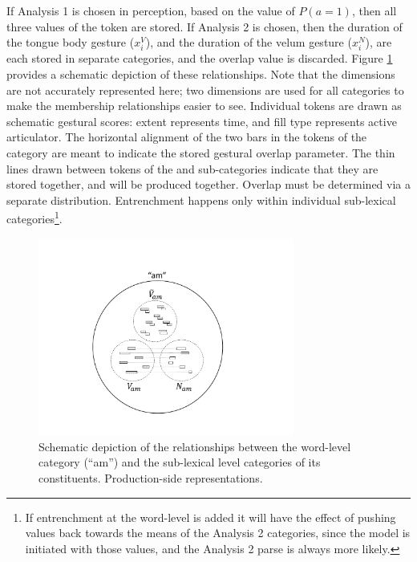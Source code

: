 If Analysis 1 is chosen in perception, based on the value of $P(a=1)$,
then all three values of the token are stored. If Analysis 2 is chosen,
then the duration of the tongue body gesture ($x_{i}^{V}$), and the
duration of the velum gesture ($x_{i}^{N}$), are each stored in separate
categories, and the overlap value is discarded. Figure \ref{fig:MultiParse-Reps}
provides a schematic depiction of these relationships. Note that the
dimensions are not accurately represented here; two dimensions are
used for all categories to make the membership relationships easier
to see. Individual tokens are drawn as schematic gestural scores:
extent represents time, and fill type represents active articulator.
The horizontal alignment of the two bars in the tokens of the category
are meant to indicate the stored gestural overlap parameter. The thin
lines drawn between tokens of the and sub-categories indicate that
they are stored together, and will be produced together. Overlap must
be determined via a separate distribution. Entrenchment happens only
within individual sub-lexical categories\footnote{If entrenchment at the word-level is added it will have the effect
of pushing values back towards the means of the Analysis 2 categories,
since the model is initiated with those values, and the Analysis 2
parse is always more likely.}.

\begin{figure}[h]

\includegraphics[width=0.75\textwidth]{figures/MultiParseModel.pdf}\caption{\label{fig:MultiParse-Reps}Schematic depiction of the relationships
between the word-level category (“am”) and the sub-lexical level
categories of its constituents. Production-side representations.}

\end{figure}

